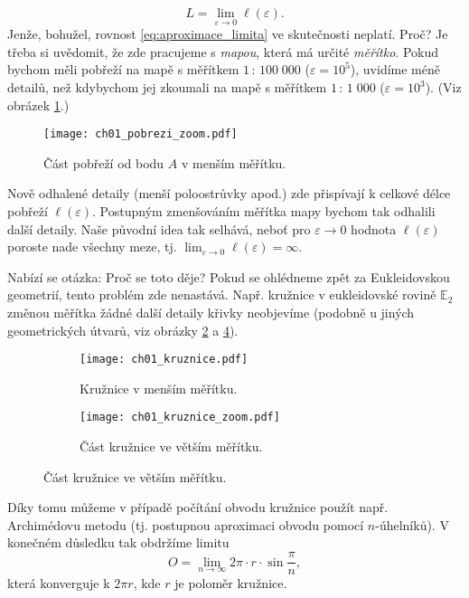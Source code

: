 \begin{equation}\label{eq:aproximace_limita}
    L=\lim_{\varepsilon\to0}{\ell(\varepsilon)}.
\end{equation}
Jenže, bohužel, rovnost \eqref{eq:aproximace_limita} ve skutečnosti neplatí. Proč? Je třeba si uvědomit, že zde pracujeme s \emph{mapou}, která má určité \emph{měřítko}. Pokud bychom měli pobřeží na mapě s měřítkem $1\,:\,100\;000$ ($\varepsilon=10^5$), uvidíme méně detailů, než kdybychom jej zkoumali na mapě s měřítkem $1\,:\,1\;000$ ($\varepsilon=10^3$). (Viz obrázek \ref{fig:pobrezi_zoom}.)\par
\begin{figure}[h]
    \centering
    \texttt{[image: ch01\_pobrezi\_zoom.pdf]}
    \caption{Část pobřeží od bodu $A$ v menším měřítku.}
    \label{fig:pobrezi_zoom}
\end{figure}
Nově odhalené detaily (menší poloostrůvky apod.) zde přispívají k celkové délce pobřeží $\ell(\varepsilon)$. Postupným zmenšováním měřítka mapy bychom tak odhalili další detaily. Naše původní idea tak selhává, neboť pro $\varepsilon\to0$ hodnota $\ell(\varepsilon)$ poroste nade všechny meze, tj. $\lim_{\varepsilon\to0}{\ell(\varepsilon)}=\infty$.\par
Nabízí se otázka: Proč se toto děje? Pokud se ohlédneme zpět za Eukleidovskou geometrií, tento problém zde nenastává. Např. kružnice v eukleidovské rovině $\mathbb{E}_2$ změnou měřítka žádné další detaily křivky neobjevíme (podobně u jiných geometrických útvarů, viz obrázky \ref{subfig:kruznice} a \ref{subfig:kruznice_zoom}). 
\begin{figure}[h]
    \centering
    \begin{subfigure}{\subfigwidth}
        \centering
        \texttt{[image: ch01\_kruznice.pdf]}
        \caption{Kružnice v menším měřítku.}
        \label{subfig:kruznice}
    \end{subfigure}
    \quad
    \begin{subfigure}{\subfigwidth}
        \centering
        \texttt{[image: ch01\_kruznice\_zoom.pdf]}
        \caption{Část kružnice ve větším měřítku.}
        \label{subfig:kruznice_zoom}
    \end{subfigure}
\end{figure}
Díky tomu můžeme v případě počítání obvodu kružnice použít např. Archimédovu metodu (tj. postupnou aproximaci obvodu pomocí $n$-úhelníků). V konečném důsledku tak obdržíme limitu
\begin{equation*}
    O=\lim_{n\to\infty}{2\pi\cdot r\cdot\sin{\dfrac{\pi}{n}}},
\end{equation*}
která konverguje k $2\pi r$, kde $r$ je poloměr kružnice.\par
